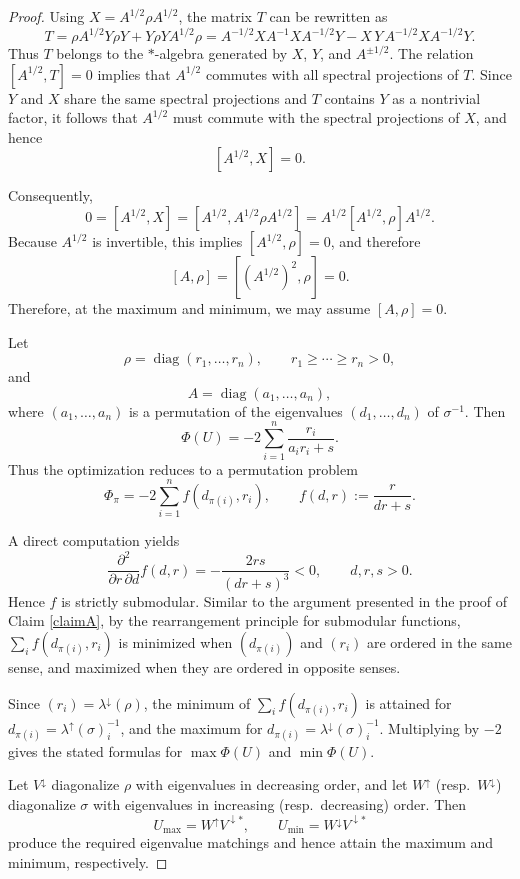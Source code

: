 \documentclass[10pt,reqno]{amsart}
\theoremstyle{break-italic}
\theoremstyle{break-italic}
\theoremstyle{break-italic}
\theoremstyle{break-italic}
\theoremstyle{break-italic}
\theoremstyle{break-italic}
\theoremstyle{break-italic}
\theoremstyle{break-italic}
\theoremstyle{break-roman}
\theoremstyle{standard}
\theoremstyle{varthm-roman}
\theoremstyle{varthm-italic}
\theoremstyle{varthm-roman-break}
\theoremstyle{varthm-italic-break}
\theoremstyle{varthm-roman-no-punctuation}
\theoremstyle{varthm-italic-no-punctuation}
\numberwithin{equation}{section}
\begin{document}
\begin{proof}
Using $X=A^{1/2}\rho A^{1/2}$, the matrix $T$ can be rewritten as
\[
T
=
\rho A^{1/2}Y\rho Y+Y\rho Y A^{1/2}\rho
=
A^{-1/2}X A^{-1} X A^{-1/2}Y
-
X\,Y\,A^{-1/2}X A^{-1/2}Y.
\]
Thus $T$ belongs to the $\ast$-algebra generated by $X$, $Y$, and $A^{\pm 1/2}$.
The relation $[A^{1/2},T]=0$ implies that $A^{1/2}$ commutes with all spectral
projections of $T$. Since $Y$ and $X$ share the same spectral projections and
$T$ contains $Y$ as a nontrivial factor, it follows that $A^{1/2}$ must commute
with the spectral projections of $X$, and hence
\[
[A^{1/2},X]=0.
\]

Consequently,
\[
0=[A^{1/2},X]
=[A^{1/2},A^{1/2}\rho A^{1/2}]
=A^{1/2}[A^{1/2},\rho]A^{1/2}.
\]
Because $A^{1/2}$ is invertible, this implies $[A^{1/2},\rho]=0$, and therefore
\[
[A,\rho]=[(A^{1/2})^2,\rho]=0.
\]
Therefore, at the maximum and minimum, we may assume $[A, \rho] = 0$.


Let
\[
\rho=\operatorname{diag}(r_1,\dots,r_n),
\qquad
r_1\ge\cdots\ge r_n>0,
\]
and
\[
A=\operatorname{diag}(a_1,\dots,a_n),
\]
where $(a_1,\dots,a_n)$ is a permutation of the eigenvalues
$(d_1,\dots,d_n)$ of $\sigma^{-1}$.
Then
\[
\Phi(U)
=
-2\sum_{i=1}^n \frac{r_i}{a_i r_i+s}.
\]
Thus the optimization reduces to a permutation problem
\[
\Phi_\pi
=
-2\sum_{i=1}^n f(d_{\pi(i)},r_i),
\qquad
f(d,r):=\frac{r}{dr+s}.
\]

A direct computation yields
\[
\frac{\partial^2}{\partial r\,\partial d}f(d,r)
=
-\frac{2rs}{(dr+s)^3}<0,
\qquad d,r,s>0.
\]
Hence $f$ is strictly submodular.  Similar to the argument presented in the proof of Claim \ref{claimA}, by the rearrangement principle for submodular functions, $\sum_i f(d_{\pi(i)},r_i)$ is minimized when
$(d_{\pi(i)})$ and $(r_i)$ are ordered in the same sense, and maximized when they
are ordered in opposite senses.

Since $(r_i)=\lambda^\downarrow(\rho)$, the minimum of $\sum_i f(d_{\pi(i)},r_i)$ is attained for
$d_{\pi(i)}=\lambda^\uparrow(\sigma)^{-1}_i$, and the maximum for
$d_{\pi(i)}=\lambda^\downarrow(\sigma)^{-1}_i$.
Multiplying by $-2$ gives the stated formulas for
$\max\Phi(U)$ and $\min\Phi(U)$.

Let $V^\downarrow$ diagonalize $\rho$ with eigenvalues in decreasing order,
and let $W^\uparrow$ (resp.\ $W^\downarrow$) diagonalize $\sigma$ with eigenvalues
in increasing (resp.\ decreasing) order.
Then
\[
U_{\max}=W^\uparrow V^{\downarrow *},
\qquad
U_{\min}=W^\downarrow V^{\downarrow *}
\]
produce the required eigenvalue matchings and hence attain the maximum and minimum,
respectively.
\end{proof}
\end{document}
